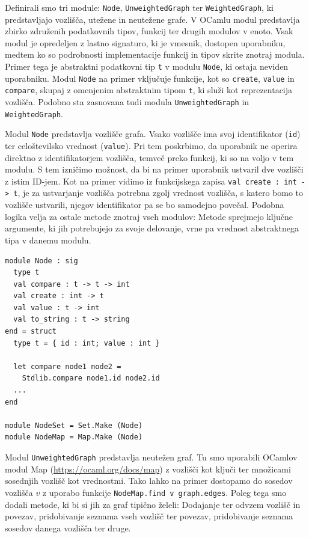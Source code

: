 \documentclass[mat1, tisk]{fmfdelo}
\begin{document}
Definirali smo tri module: \texttt{Node}, \texttt{UnweightedGraph} ter \texttt{WeightedGraph}, ki predstavljajo
vozlišča, utežene in neutežene grafe. V OCamlu modul predstavlja zbirko združenih podatkovnih tipov, funkcij ter drugih modulov v enoto.
Vsak modul je opredeljen z lastno signaturo, ki je vmesnik, dostopen uporabniku, medtem ko so podrobnosti
implementacije funkcij in tipov skrite znotraj modula. 
Primer tega je abstraktni podatkovni tip \texttt{t} v modulu \texttt{Node}, ki ostaja neviden uporabniku.
Modul \texttt{Node} na primer vključuje funkcije, kot so \texttt{create}, \texttt{value} in \texttt{compare},
skupaj z omenjenim abstraktnim tipom \texttt{t}, ki služi kot reprezentacija vozlišča.
Podobno sta zasnovana tudi modula \texttt{UnweightedGraph} in \texttt{WeightedGraph}.

Modul \texttt{Node} predstavlja vozlišče grafa. 
Vsako vozlišče ima svoj identifikator (\texttt{id}) ter celoštevilsko vrednost (\texttt{value}). Pri tem poskrbimo, da uporabnik ne 
operira direktno z identifikatorjem vozlišča, temveč preko funkcij, ki so na voljo v tem modulu.
S tem izničimo možnost, da bi na primer uporabnik ustvaril dve vozlišči z istim ID-jem. 
Kot na primer vidimo iz funkcijskega zapisa \texttt{val create : int -> t}, je za ustvarjanje vozlišča potrebna
zgolj vrednost vozlišča, s katero bomo to vozlišče ustvarili, njegov identifikator pa se bo samodejno povečal.
Podobna logika velja za ostale metode znotraj vseh modulov: Metode sprejmejo ključne argumente, ki jih potrebujejo
za svoje delovanje, vrne pa vrednost abstraktnega tipa v danemu modulu.

\begin{lstlisting}
module Node : sig
  type t
  val compare : t -> t -> int
  val create : int -> t
  val value : t -> int
  val to_string : t -> string
end = struct
  type t = { id : int; value : int }

  let compare node1 node2 = 
    Stdlib.compare node1.id node2.id
  ...
end

module NodeSet = Set.Make (Node)
module NodeMap = Map.Make (Node)

\end{lstlisting}

Modul \texttt{UnweightedGraph} predstavlja neutežen graf.
Tu smo uporabili OCamlov modul Map (\url{https://ocaml.org/docs/map}) z vozlišči kot ključi ter množicami sosednjih vozlišč
kot vrednostmi. Tako lahko na primer dostopamo do sosedov vozlišča $v$ z uporabo funkcije \texttt{NodeMap.find v graph.edges}.
Poleg tega smo dodali metode, ki bi si jih za graf tipično želeli: Dodajanje ter odvzem
vozlišč in povezav, pridobivanje seznama vseh vozlišč ter povezav, pridobivanje seznama sosedov danega vozlišča
ter druge.
\end{document}
